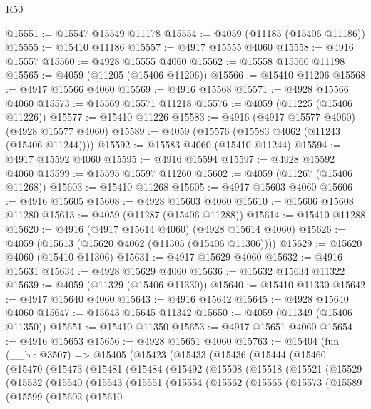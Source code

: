 \begin{lexlean}{R50}
\begin{coremodule}
@15551 := @15547 @15549 @11178
@15554 := @4059 (@11185 (@15406 @11186))
@15555 := @15410 @11186
@15557 := @4917 @15555 @4060
@15558 := @4916 @15557
@15560 := @4928 @15555 @4060
@15562 := @15558 @15560 @11198
@15565 := @4059 (@11205 (@15406 @11206))
@15566 := @15410 @11206
@15568 := @4917 @15566 @4060
@15569 := @4916 @15568
@15571 := @4928 @15566 @4060
@15573 := @15569 @15571 @11218
@15576 := @4059 (@11225 (@15406 @11226))
@15577 := @15410 @11226
@15583 := @4916 (@4917 @15577 @4060) (@4928 @15577 @4060)
@15589 := @4059 (@15576 (@15583 @4062 (@11243 (@15406 @11244))))
@15592 := @15583 @4060 (@15410 @11244)
@15594 := @4917 @15592 @4060
@15595 := @4916 @15594
@15597 := @4928 @15592 @4060
@15599 := @15595 @15597 @11260
@15602 := @4059 (@11267 (@15406 @11268))
@15603 := @15410 @11268
@15605 := @4917 @15603 @4060
@15606 := @4916 @15605
@15608 := @4928 @15603 @4060
@15610 := @15606 @15608 @11280
@15613 := @4059 (@11287 (@15406 @11288))
@15614 := @15410 @11288
@15620 := @4916 (@4917 @15614 @4060) (@4928 @15614 @4060)
@15626 := @4059 (@15613 (@15620 @4062 (@11305 (@15406 @11306))))
@15629 := @15620 @4060 (@15410 @11306)
@15631 := @4917 @15629 @4060
@15632 := @4916 @15631
@15634 := @4928 @15629 @4060
@15636 := @15632 @15634 @11322
@15639 := @4059 (@11329 (@15406 @11330))
@15640 := @15410 @11330
@15642 := @4917 @15640 @4060
@15643 := @4916 @15642
@15645 := @4928 @15640 @4060
@15647 := @15643 @15645 @11342
@15650 := @4059 (@11349 (@15406 @11350))
@15651 := @15410 @11350
@15653 := @4917 @15651 @4060
@15654 := @4916 @15653
@15656 := @4928 @15651 @4060
@15763 := @15404
    (fun (__b : @3507) =>
    @15405
      (@15423
        (@15433
          (@15436
            (@15444
              (@15460
                (@15470
                  (@15473
                    (@15481
                      (@15484
                        (@15492
                          (@15508
                            (@15518
                              (@15521
                                (@15529
                                  (@15532
                                    (@15540
                                      (@15543
                                        (@15551
                                          (@15554
                                            (@15562
                                              (@15565
                                                (@15573
                                                  (@15589
                                                    (@15599
                                                      (@15602
                                                        (@15610

\end{coremodule}
\end{lexlean}
